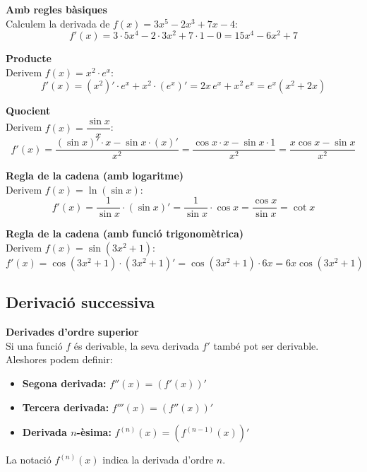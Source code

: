 \documentclass[12pt]{article}
\begin{document}
\begin{exemple}
\textbf{Amb regles bàsiques}\\
Calculem la derivada de $f(x)=3x^5-2x^3+7x-4$:
\[
f'(x)=3\cdot 5x^4-2\cdot 3x^2+7\cdot 1-0=15x^4-6x^2+7
\]
\end{exemple}

\begin{exemple}
\textbf{Producte}\\
Derivem $f(x)=x^2\cdot e^x$:
\[
f'(x)=(x^2)'\cdot e^x + x^2\cdot (e^x)' = 2x\,e^x + x^2\,e^x = e^x(x^2+2x)
\]
\end{exemple}

\begin{exemple}
\textbf{Quocient}\\
Derivem $f(x)=\dfrac{\sin x}{x}$:
\[
f'(x)=\frac{(\sin x)'\cdot x - \sin x\cdot (x)'}{x^2}
      =\frac{\cos x\cdot x - \sin x\cdot 1}{x^2}
      =\frac{x\cos x-\sin x}{x^2}
\]
\end{exemple}

\begin{exemple}
\textbf{Regla de la cadena (amb logaritme)}\\
Derivem $f(x)=\ln(\sin x)$:
\[
f'(x)=\frac{1}{\sin x}\cdot (\sin x)'
      =\frac{1}{\sin x}\cdot \cos x = \frac{\cos x}{\sin x} = \cot x
\]
\end{exemple}

\begin{exemple}
\textbf{Regla de la cadena (amb funció trigonomètrica)}\\
Derivem $f(x)=\sin(3x^2+1)$:
\[
f'(x)=\cos(3x^2+1)\cdot (3x^2+1)'
      =\cos(3x^2+1)\cdot 6x
      =6x\cos(3x^2+1)
\]
\end{exemple}


\subsection{Derivació successiva}

\begin{concept}
\textbf{Derivades d'ordre superior}\\
Si una funció $f$ és derivable, la seva derivada $f'$ també pot ser derivable. Aleshores podem definir:
\begin{itemize}
    \item \textbf{Segona derivada:} $f''(x)=(f'(x))'$
    \item \textbf{Tercera derivada:} $f'''(x)=(f''(x))'$
    \item \textbf{Derivada $n$-èsima:} $f^{(n)}(x)=(f^{(n-1)}(x))'$
\end{itemize}
La notació $f^{(n)}(x)$ indica la derivada d'ordre $n$.
\end{concept}
\end{document}
